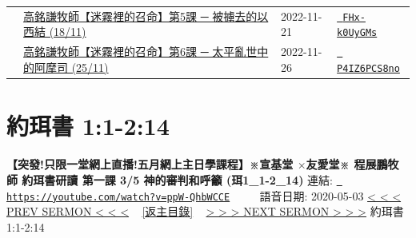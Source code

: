 \documentclass{book}
\begin{document}
{\begin{xltabular}{\textwidth}{|p{0.15\textwidth} p{0.6\textwidth}|p{0.07\textwidth} p{0.1\textwidth}|}
    & \hyperref[sec:FHx_k0UyGMs]{高銘謙牧師【迷霧裡的召命】第5課 ─ 被擄去的以西結 (18/11)} & 2022-11-21 & \href{https://youtube.com/watch?v=FHx-k0UyGMs}{\texttt{ FHx-k0UyGMs}} \\
    & \hyperref[sec:P4IZ6PCS8no]{高銘謙牧師【迷霧裡的召命】第6課 ─ 太平亂世中的阿摩司 (25/11)} & 2022-11-26 & \href{https://youtube.com/watch?v=P4IZ6PCS8no}{\texttt{ P4IZ6PCS8no}} \\
\end{xltabular}
}
\newpage



\section{約珥書 1:1-2:14}
\label{sec:ppW_QhbWCCE}
\textbf{【突發!只限一堂網上直播!五月網上主日學課程】※宣基堂 $\times$友愛堂※ 程展鵬牧師 約珥書研讀 第一課 3/5 神的審判和呼籲 (珥1\_1-2\_14)}
\newline
\newline
連結: \href{https://youtube.com/watch?v=ppW-QhbWCCE}{\texttt{ https://youtube.com/watch?v=ppW-QhbWCCE}} ~~~~ 語音日期: 2020-05-03 
\newline
\newline
\hyperref[sec:code]{\small{< < < PREV SERMON < < <}}
~
\hyperref[sec:index]{\small{[返主目錄]}}
~
\hyperref[sec:V3TY9OLIKOY]{\small{> > > NEXT SERMON > > >}}
\newline
\newline
約珥書 1:1-2:14
\newline
\end{document}
